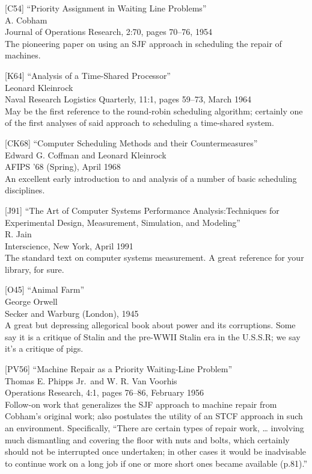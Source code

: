 {[}C54{]} ``Priority Assignment in Waiting Line Problems''\\
A. Cobham\\
Journal of Operations Research, 2:70, pages 70--76, 1954\\
The pioneering paper on using an SJF approach in scheduling the repair
of machines.

{[}K64{]} ``Analysis of a Time-Shared Processor''\\
Leonard Kleinrock\\
Naval Research Logistics Quarterly, 11:1, pages 59--73, March 1964\\
May be the first reference to the round-robin scheduling algorithm;
certainly one of the first analyses of said approach to scheduling a
time-shared system.

{[}CK68{]} ``Computer Scheduling Methods and their Countermeasures''\\
Edward G. Coffman and Leonard Kleinrock\\
AFIPS '68 (Spring), April 1968\\
An excellent early introduction to and analysis of a number of basic
scheduling disciplines.

{[}J91{]} ``The Art of Computer Systems Performance Analysis:Techniques
for Experimental Design, Measurement, Simulation, and Modeling''\\
R. Jain\\
Interscience, New York, April 1991\\
The standard text on computer systems measurement. A great reference for
your library, for sure.

{[}O45{]} ``Animal Farm''\\
George Orwell\\
Secker and Warburg (London), 1945\\
A great but depressing allegorical book about power and its corruptions.
Some say it is a critique of Stalin and the pre-WWII Stalin era in the
U.S.S.R; we say it's a critique of pigs.

{[}PV56{]} ``Machine Repair as a Priority Waiting-Line Problem''\\
Thomas E. Phipps Jr.~and W. R. Van Voorhis\\
Operations Research, 4:1, pages 76--86, February 1956\\
Follow-on work that generalizes the SJF approach to machine repair from
Cobham's original work; also postulates the utility of an STCF approach
in such an environment. Specifically, ``There are certain types of
repair work, \ldots{} involving much dismantling and covering the floor
with nuts and bolts, which certainly should not be interrupted once
undertaken; in other cases it would be inadvisable to continue work on a
long job if one or more short ones became available (p.81).''

